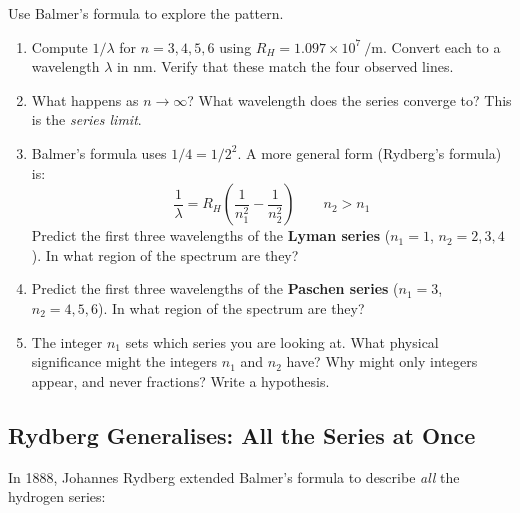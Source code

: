 \documentclass[12pt, a4paper]{book}
\newcommand{\newterm}[1]{\textit{\textcolor{DiscoveryColor}{#1}}}
\begin{document}
\begin{puzzlebox}
Use Balmer's formula to explore the pattern.

\begin{enumerate}[label=(\alph*), leftmargin=*]
  \item Compute $1/\lambda$ for $n = 3, 4, 5, 6$ using
        $R_H = 1.097\times10^7\ \si{\per\metre}$.
        Convert each to a wavelength $\lambda$ in nm.
        Verify that these match the four observed lines.

  \item What happens as $n \to \infty$?
        What wavelength does the series converge to?
        This is the \newterm{series limit}.

  \item Balmer's formula uses $1/4 = 1/2^2$.
        A more general form (Rydberg's formula) is:
        \[
          \frac{1}{\lambda} = R_H\left(\frac{1}{n_1^2} - \frac{1}{n_2^2}\right)
          \qquad n_2 > n_1
        \]
        Predict the first three wavelengths of the \textbf{Lyman series}
        ($n_1 = 1$, $n_2 = 2, 3, 4$).
        In what region of the spectrum are they?

  \item Predict the first three wavelengths of the
        \textbf{Paschen series} ($n_1 = 3$, $n_2 = 4, 5, 6$).
        In what region of the spectrum are they?

  \item The integer $n_1$ sets which series you are looking at.
        What physical significance might the integers $n_1$ and
        $n_2$ have?
        Why might only integers appear, and never fractions?
        Write a hypothesis.
\end{enumerate}
\end{puzzlebox}

\subsection{Rydberg Generalises: All the Series at Once}

In 1888, Johannes Rydberg extended Balmer's formula to
describe \emph{all} the hydrogen series:
\end{document}
